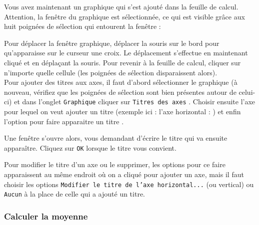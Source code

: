 Vous avez maintenant un graphique qui s'est ajouté dans la feuille de calcul. Attention, la fenêtre du graphique est sélectionnée, ce qui est visible grâce aux huit poignées de sélection qui entourent la fenêtre :


Pour déplacer la fenêtre graphique, déplacer la souris sur le bord pour qu'apparaisse sur le curseur une croix. Le déplacement s'effectue en maintenant cliqué et en déplaçant la souris. Pour revenir à la feuille de calcul, cliquer sur n'importe quelle cellule (les poignées de sélection disparaissent alors).\\


Pour ajouter des titres aux axes, il faut d'abord sélectionner le graphique (à nouveau, vérifiez que les poignées de sélection sont bien présentes autour de celui-ci) et dans l'onglet \texttt{Graphique} cliquer sur \texttt{Titres des axes}  . Choisir ensuite l'axe pour lequel on veut ajouter un titre (exemple ici : l'axe horizontal : ) et enfin l'option pour faire apparaitre un titre .


Une fenêtre s'ouvre alors, vous demandant d'écrire le titre qui va ensuite apparaître. Cliquez sur \texttt{OK} lorsque le titre vous convient.

Pour modifier le titre d'un axe ou le supprimer, les options pour ce faire apparaissent au même endroit où on a cliqué pour ajouter un axe, mais il faut choisir les options \texttt{Modifier le titre de l'axe horizontal...} (ou vertical) ou \texttt{Aucun} à la place de celle qui a ajouté un titre.


\subsubsection{Calculer la moyenne}

